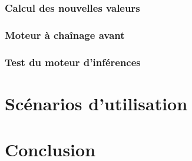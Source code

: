 \documentclass[a4paper,10pt]{report}
\begin{document}
    \subsection{Calcul des nouvelles valeurs}
    \subsection{Moteur à chaînage avant}
    \subsection{Test du moteur d'inférences}
\chapter{Scénarios d'utilisation}
\chapter*{Conclusion}

  
\end{document}
